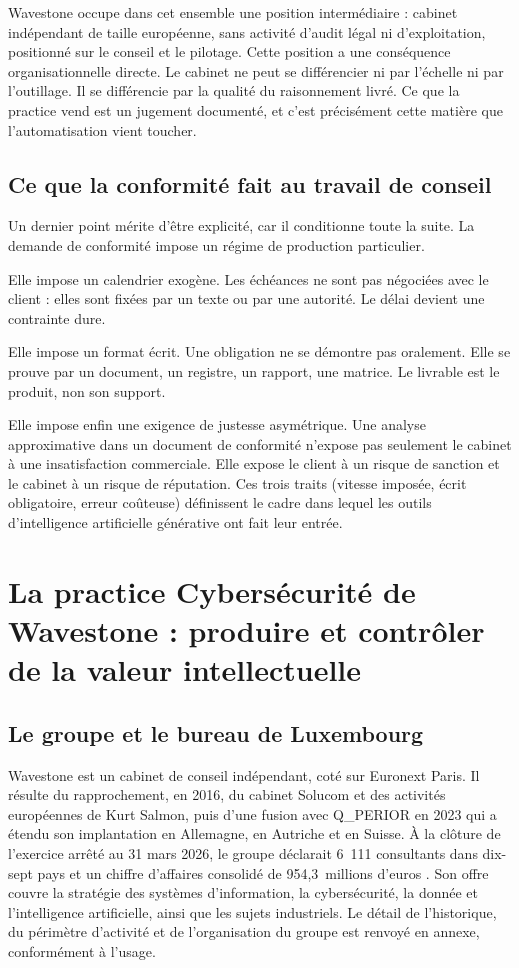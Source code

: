 Wavestone occupe dans cet ensemble une position intermédiaire : cabinet indépendant de
taille européenne, sans activité d'audit légal ni d'exploitation, positionné sur le conseil
et le pilotage. Cette position a une conséquence organisationnelle directe. Le cabinet ne
peut se différencier ni par l'échelle ni par l'outillage. Il se différencie par la qualité
du raisonnement livré. Ce que la practice vend est un jugement documenté, et c'est
précisément cette matière que l'automatisation vient toucher.

\subsection{Ce que la conformité fait au travail de conseil}

Un dernier point mérite d'être explicité, car il conditionne toute la suite. La demande de
conformité impose un régime de production particulier.

Elle impose un calendrier exogène. Les échéances ne sont pas négociées avec le client :
elles sont fixées par un texte ou par une autorité. Le délai devient une contrainte dure.

Elle impose un format écrit. Une obligation ne se démontre pas oralement. Elle se prouve par
un document, un registre, un rapport, une matrice. Le livrable est le produit, non son
support.

Elle impose enfin une exigence de justesse asymétrique. Une analyse approximative dans un
document de conformité n'expose pas seulement le cabinet à une insatisfaction commerciale.
Elle expose le client à un risque de sanction et le cabinet à un risque de réputation. Ces
trois traits (vitesse imposée, écrit obligatoire, erreur coûteuse) définissent le cadre
dans lequel les outils d'intelligence artificielle générative ont fait leur entrée.

\section{La practice Cybersécurité de Wavestone : produire et contrôler de la valeur intellectuelle}

\subsection{Le groupe et le bureau de Luxembourg}

Wavestone est un cabinet de conseil indépendant, coté sur Euronext Paris. Il résulte du
rapprochement, en 2016, du cabinet Solucom et des activités européennes de Kurt Salmon,
puis d'une fusion avec Q\_PERIOR en 2023 qui a étendu son implantation en Allemagne, en
Autriche et en Suisse. À la clôture de l'exercice arrêté au 31 mars 2026, le groupe
déclarait 6~111 consultants dans dix-sept pays et un chiffre d'affaires consolidé de
954,3~millions d'euros \cite{wavestone2026results}. Son offre couvre la stratégie des systèmes d'information, la
cybersécurité, la donnée et l'intelligence artificielle, ainsi que les sujets industriels.
Le détail de l'historique, du périmètre d'activité et de l'organisation du groupe est
renvoyé en annexe, conformément à l'usage.

